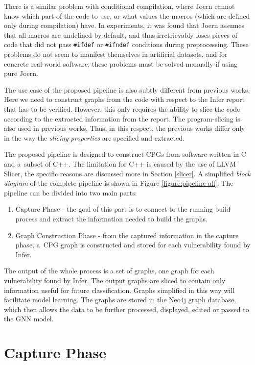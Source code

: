 There is a similar problem with conditional compilation, where Joern cannot know which part of the code to use, or what values the macros (which are defined only during compilation) have. In experiments, it was found that Joern assumes that all macros are undefined by default, and thus irretrievably loses pieces of code that did not pass \texttt{\#ifdef} or \texttt{\#ifndef} conditions during preprocessing. These problems do not seem to manifest themselves in artificial datasets, and for concrete real-world software, these problems must be solved manually if using pure Joern.

The use case of the proposed pipeline is also subtly different from previous works. Here we need to construct graphs from the code with respect to the Infer report that has to be verified. However, this only requires the ability to slice the code according to the extracted information from the report. The program-slicing is also used in previous works. Thus, in this respect, the previous works differ only in the way the \textit{slicing properties} are specified and extracted.

The proposed pipeline is designed to construct CPGs from software written in C and a~subset of C++. The limitation for C++ is caused by the use of LLVM Slicer, the specific reasons are discussed more in Section \ref{slicer}. A simplified \textit{block diagram} of the complete pipeline is shown in Figure \ref{figure:pipeline-all}. The pipeline can be divided into two main parts:
 
\begin{enumerate}
    \item Capture Phase - the goal of this part is to connect to the running build process and extract the information needed to build the graphs.
    \item Graph Construction Phase - from the captured information in the capture phase, a~CPG graph is constructed and stored for each vulnerability found by Infer.
\end{enumerate}

The output of the whole process is a set of graphs, one graph for each vulnerability found by Infer. The output graphs are sliced to contain only information useful for future classification. Graphs simplified in this way will facilitate model learning. The graphs are stored in the Neo4j graph database, which then allows the data to be further processed, displayed, edited or passed to the GNN model.


\section{Capture Phase}
\label{capture-phase}

